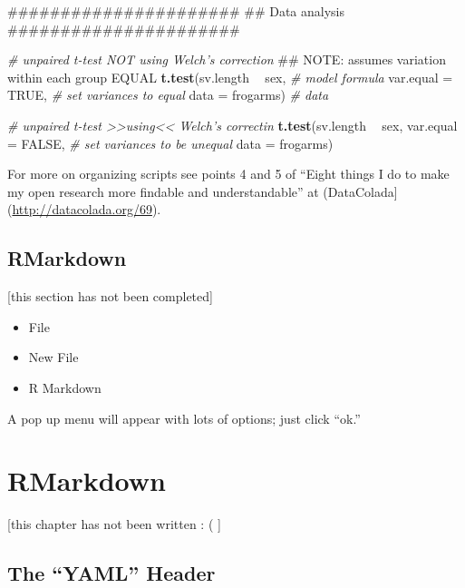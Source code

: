 \documentclass[]{book}
\newenvironment{Shaded}{\begin{snugshade}}{\end{snugshade}}
\newcommand{\KeywordTok}[1]{\textcolor[rgb]{0.13,0.29,0.53}{\textbf{#1}}}
\newcommand{\DataTypeTok}[1]{\textcolor[rgb]{0.13,0.29,0.53}{#1}}
\newcommand{\StringTok}[1]{\textcolor[rgb]{0.31,0.60,0.02}{#1}}
\newcommand{\CommentTok}[1]{\textcolor[rgb]{0.56,0.35,0.01}{\textit{#1}}}
\newcommand{\OtherTok}[1]{\textcolor[rgb]{0.56,0.35,0.01}{#1}}
\newcommand{\OperatorTok}[1]{\textcolor[rgb]{0.81,0.36,0.00}{\textbf{#1}}}
\newcommand{\AlertTok}[1]{\textcolor[rgb]{0.94,0.16,0.16}{#1}}
\newcommand{\NormalTok}[1]{#1}
\providecommand{\tightlist}{%
  \setlength{\itemsep}{0pt}\setlength{\parskip}{0pt}}
\theoremstyle{definition}
\theoremstyle{definition}
\theoremstyle{definition}
\theoremstyle{remark}
\begin{document}
\begin{Shaded}
\begin{Highlighting}[]
\NormalTok{######################}
\NormalTok{## Data analysis}
\NormalTok{######################}

\CommentTok{# unpaired t-test NOT using Welch's correction}
\NormalTok{## }\AlertTok{NOTE}\NormalTok{: assumes variation within each group EQUAL}
\KeywordTok{t.test}\NormalTok{(sv.length }\OperatorTok{~}\StringTok{ }\NormalTok{sex,   }\CommentTok{# model formula}
       \DataTypeTok{var.equal =} \OtherTok{TRUE}\NormalTok{,  }\CommentTok{# set variances to equal }
         \DataTypeTok{data =}\NormalTok{ frogarms) }\CommentTok{# data}

\CommentTok{# unpaired t-test >>using<< Welch's correctin}
\KeywordTok{t.test}\NormalTok{(sv.length }\OperatorTok{~}\StringTok{ }\NormalTok{sex, }
       \DataTypeTok{var.equal =} \OtherTok{FALSE}\NormalTok{, }\CommentTok{# set variances to be unequal }
         \DataTypeTok{data =}\NormalTok{ frogarms)}
\end{Highlighting}
\end{Shaded}

For more on organizing scripts see points 4 and 5 of ``Eight things I do
to make my open research more findable and understandable'' at
(DataColada{]}(\url{http://datacolada.org/69}).

\section{RMarkdown}\label{rmarkdown}

{[}this section has not been completed{]}

\begin{itemize}
\tightlist
\item
  File
\item
  New File
\item
  R Markdown
\end{itemize}

A pop up menu will appear with lots of options; just click ``ok.''

\chapter{RMarkdown}\label{rmarkdown-1}

{[}this chapter has not been written : ( {]}

\section{\texorpdfstring{The ``YAML''
Header}{The YAML Header}}\label{the-yaml-header}
\end{document}
